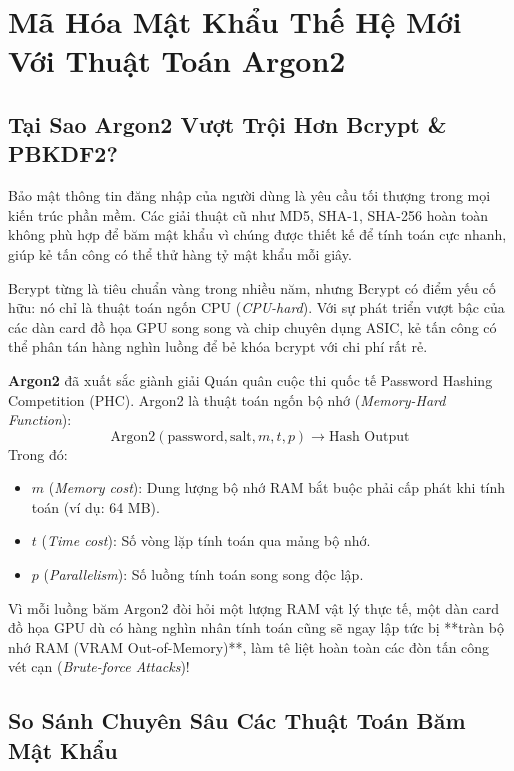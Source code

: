 \documentclass[12pt,a4paper,oneside]{book}
\begin{document}
\chapter{Mã Hóa Mật Khẩu Thế Hệ Mới Với Thuật Toán Argon2}

\section{Tại Sao Argon2 Vượt Trội Hơn Bcrypt \& PBKDF2?}
Bảo mật thông tin đăng nhập của người dùng là yêu cầu tối thượng trong mọi kiến trúc phần mềm. Các giải thuật cũ như MD5, SHA-1, SHA-256 hoàn toàn không phù hợp để băm mật khẩu vì chúng được thiết kế để tính toán cực nhanh, giúp kẻ tấn công có thể thử hàng tỷ mật khẩu mỗi giây.

Bcrypt từng là tiêu chuẩn vàng trong nhiều năm, nhưng Bcrypt có điểm yếu cố hữu: nó chỉ là thuật toán ngốn CPU (\textit{CPU-hard}). Với sự phát triển vượt bậc của các dàn card đồ họa GPU song song và chip chuyên dụng ASIC, kẻ tấn công có thể phân tán hàng nghìn luồng để bẻ khóa bcrypt với chi phí rất rẻ.

\textbf{Argon2} đã xuất sắc giành giải Quán quân cuộc thi quốc tế Password Hashing Competition (PHC). Argon2 là thuật toán ngốn bộ nhớ (\textit{Memory-Hard Function}):
\begin{equation}
  \text{Argon2}(\text{password}, \text{salt}, m, t, p) \longrightarrow \text{Hash Output}
\end{equation}
Trong đó:
\begin{itemize}
  \item $m$ (\textit{Memory cost}): Dung lượng bộ nhớ RAM bắt buộc phải cấp phát khi tính toán (ví dụ: 64 MB).
  \item $t$ (\textit{Time cost}): Số vòng lặp tính toán qua mảng bộ nhớ.
  \item $p$ (\textit{Parallelism}): Số luồng tính toán song song độc lập.
\end{itemize}

Vì mỗi luồng băm Argon2 đòi hỏi một lượng RAM vật lý thực tế, một dàn card đồ họa GPU dù có hàng nghìn nhân tính toán cũng sẽ ngay lập tức bị **tràn bộ nhớ RAM (VRAM Out-of-Memory)**, làm tê liệt hoàn toàn các đòn tấn công vét cạn (\textit{Brute-force Attacks})!

\section{So Sánh Chuyên Sâu Các Thuật Toán Băm Mật Khẩu}
\end{document}
